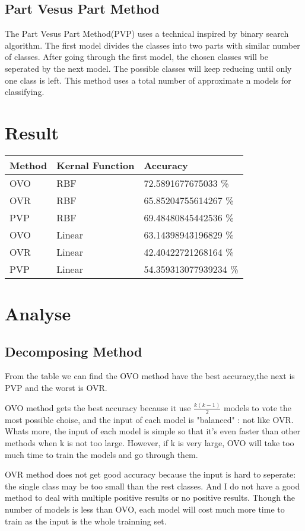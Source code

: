 \documentclass[11pt]{article}
\begin{document}
\subsection{Part Vesus Part Method}
\label{sec-1-3}
The Part Vesus Part Method(PVP) uses a technical inspired by binary search algorithm.
The first model divides the classes into two parts with similar number of classes.
After going through the first model, the chosen classes will be seperated by the next
model. The possible classes will keep reducing until only one class is left. This method
uses a total number of approximate n models for classifying.
\section{Result}
\label{sec-2}
\begin{center}
\begin{tabular}{lll}
\hline
Method & Kernal Function & Accuracy\\
\hline
OVO & RBF & 72.5891677675033 \%\\
OVR & RBF & 65.85204755614267 \%\\
PVP & RBF & 69.48480845442536 \%\\
OVO & Linear & 63.14398943196829 \%\\
OVR & Linear & 42.40422721268164 \%\\
PVP & Linear & 54.359313077939234 \%\\
\hline
\end{tabular}
\end{center}
\section{Analyse}
\label{sec-3}
\subsection{Decomposing Method}
\label{sec-3-1}
From the table we can find the OVO method have the best accuracy,the next is PVP
and the worst is OVR.

OVO method gets the best accuracy because it use  $ \frac{k(k-1)}{2} $ models to
vote the most possible choise, and the input of each model is "balanced" : not like
OVR. Whats more, the input of each model is simple so that it's even faster than
other methods when k is not too large. However, if k is very large, OVO will
take too much time to train the models and go through them.

OVR method does not get good accuracy because the input is hard to seperate:
the single class may be too small than the rest classes. And I do not have
a good method to deal with multiple positive results or no positive results.
Though the number of models is less than OVO, each model will cost much more time
to train as the input is the whole trainning set.
\end{document}
